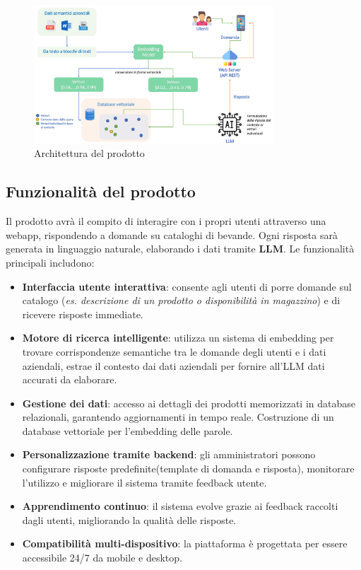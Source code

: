 \begin{figure}[h]
    \centering
    \includegraphics[width=0.8\textwidth]{img/architettura.png}
    \caption{Architettura del prodotto}
    \label{fig:architettura}
\end{figure}

\subsection{Funzionalità del prodotto}
Il prodotto avrà il compito di interagire con i propri utenti attraverso una webapp, rispondendo a domande su cataloghi di bevande. Ogni risposta sarà generata in linguaggio naturale, elaborando i dati tramite \textbf{LLM}. Le funzionalità principali includono:
\begin{itemize}
    \item \textbf{Interfaccia utente interattiva}: consente agli utenti di porre domande sul catalogo (\textit{es. descrizione di un prodotto o disponibilità in magazzino}) e di ricevere risposte immediate.
    \item \textbf{Motore di ricerca intelligente}: utilizza un sistema di embedding per trovare corrispondenze semantiche tra le domande degli utenti e i dati aziendali, estrae il contesto dai dati aziendali per fornire all'LLM dati accurati da elaborare.
    \item \textbf{Gestione dei dati}: accesso ai dettagli dei prodotti memorizzati in database relazionali, garantendo aggiornamenti in tempo reale. Costruzione di un database vettoriale per l'embedding delle parole.
    \item \textbf{Personalizzazione tramite backend}: gli amministratori possono configurare risposte predefinite(template di domanda e risposta), monitorare l’utilizzo e migliorare il sistema tramite feedback utente.
    \item \textbf{Apprendimento continuo}: il sistema evolve grazie ai feedback raccolti dagli utenti, migliorando la qualità delle risposte.
    \item \textbf{Compatibilità multi-dispositivo}: la piattaforma è progettata per essere accessibile 24/7 da mobile e desktop.
\end{itemize}

